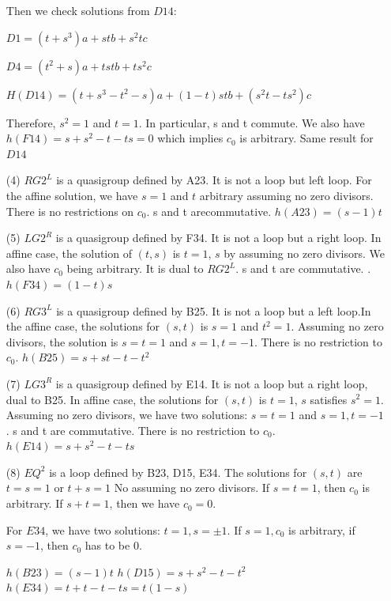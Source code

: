 \documentclass[11pt]{amsart}
\theoremstyle{definition}
\begin{document}
\begin{enumerate}
    Then we check solutions from $D14$:

    $D1 = (t+s^3)a+stb+s^2tc$

   $D4 = (t^2+s)a +tstb +ts^2c$

    $H(D14) = (t+s^3-t^2-s)a +(1-t)stb +(s^2t-ts^2)c$ 

    Therefore, $s^2 = 1$ and $t=1$. In particular, s and t commute. We also have $h(F14) = s+s^2 -t -ts =0$ which implies $c_0$ is arbitrary. Same result for $D14$

    \item[(4)] $RG2^L$ is a quasigroup defined by A23. It is not a loop but left loop. For the affine solution, we have $s=1$ and  $t$ arbitrary assuming no zero divisors. There is no restrictions on $c_0$. s and t arecommutative. $h(A23) = (s-1)t$
     
    \item[(5)] $LG2^R$ is a quasigroup defined by F34. It is not a loop but a right loop. In affine case, the solution of $(t,s)$ is $t=1$, $s$ by assuming no zero divisors. We also have $c_0$ being arbitrary. It is dual to $RG2^L$. s and t are commutative. .$h(F34) = (1-t)s$

    \item[(6)] $RG3^L$ is a quasigroup defined by B25. It is not a loop but a left loop.In the affine case, the solutions for $(s,t)$ is $s=1$ and $t^2=1$. Assuming no zero divisors, the solution is $s=t=1$ and $s=1,t=-1$. There is no restriction to $c_0$. $h(B25) = s+st-t-t^2$

   


   \item[(7)] $LG3^R$ is a quasigroup defined by E14. It is not a loop but a right loop, dual to B25. In affine case, the solutions for $(s,t)$ is $t=1$, $s$ satisfies $s^2=1$. Assuming no zero divisors, we have two solutions: $s=t=1$ and $s=1,t=-1$. s and t are commutative. There is no restriction to $c_0$. $h(E14) = s+s^2-t-ts$
    
\item[(8)] $EQ^2$ is a loop defined by B23, D15, E34. The solutions for $(s,t)$ are $t=s=1$ or $t+s = 1$ {\color{red} No} assuming no zero divisors. If $s=t=1$, then $c_0$ is arbitrary. If $s+t=1$, then we have $c_0=0$.


For $E34$, we have two solutions: $t=1, s = \pm 1$. If $s =1, c_0$ is arbitrary, if $s = -1$, then $c_0$ has to be 0.

$h(B23) = (s-1)t$
$h(D15) = s+s^2 -t -t^2$
$h(E34) = t+t-t-ts = t(1-s)$


\end{enumerate}
\end{document}
